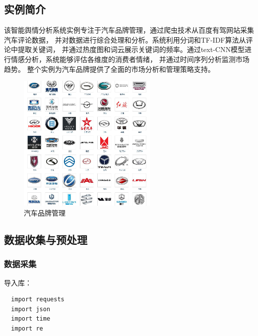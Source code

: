 \documentclass[UTF8,a4paper,15pt,titlepage,oneside]{ctexbook}
\begin{document}
\subsection{实例简介}

该智能舆情分析系统实例专注于汽车品牌管理，通过爬虫技术从百度有驾网站采集汽车评论数据，
并对数据进行综合处理和分析。系统利用分词和TF-IDF算法从评论中提取关键词，
并通过热度图和词云展示关键词的频率。通过text-CNN模型进行情感分析，系统能够评估各维度的消费者情绪，
并通过时间序列分析监测市场趋势。
整个实例为汽车品牌提供了全面的市场分析和管理策略支持。

\begin{figure}[H]
  \centering
  \includegraphics[width=0.6\textwidth,keepaspectratio=false]{pictures/34.png} %
  \caption{汽车品牌管理}
\end{figure}

\subsection{数据收集与预处理}

\subsubsection{数据采集}

导入库：

\begin{mdframed}[backgroundcolor=darkgray, linecolor=lightgray, linewidth=1pt, innermargin=0.5cm, outermargin=0.5cm, skipbelow=0.1cm]
  \color{white}
  \begin{verbatim}
  import requests
  import json
  import time
  import re    
  \end{verbatim}
  \vspace{-1.5em} %
  \end{mdframed}
\end{document}

